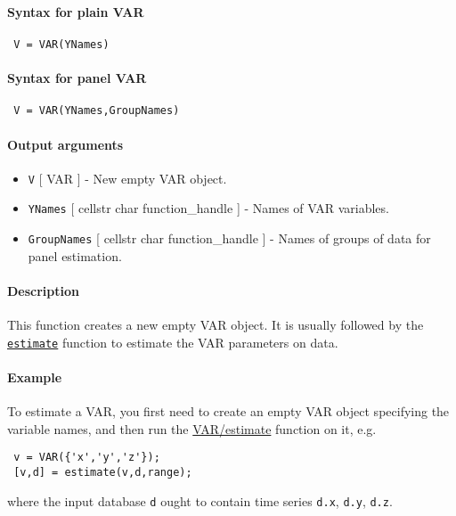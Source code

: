 


	\paragraph{Syntax for plain VAR}
 
 \begin{verbatim}
 V = VAR(YNames)
 \end{verbatim}
 
 \paragraph{Syntax for panel VAR}
 
 \begin{verbatim}
 V = VAR(YNames,GroupNames)
 \end{verbatim}
 
 \paragraph{Output arguments}
 
 \begin{itemize}
 \item
   \texttt{V} {[} VAR {]} - New empty VAR object.
 \item
   \texttt{YNames} {[} cellstr \textbar{} char \textbar{}
   function\_handle {]} - Names of VAR variables.
 \item
   \texttt{GroupNames} {[} cellstr \textbar{} char \textbar{}
   function\_handle {]} - Names of groups of data for panel estimation.
 \end{itemize}
 
 \paragraph{Description}
 
 This function creates a new empty VAR object. It is usually followed by
 the \href{VAR/estimate}{\texttt{estimate}} function to estimate the VAR
 parameters on data.
 
 \paragraph{Example}
 
 To estimate a VAR, you first need to create an empty VAR object
 specifying the variable names, and then run the
 \href{VAR/estimate}{VAR/estimate} function on it, e.g.
 
 \begin{verbatim}
 v = VAR({'x','y','z'});
 [v,d] = estimate(v,d,range);
 \end{verbatim}
 
 where the input database \texttt{d} ought to contain time series
 \texttt{d.x}, \texttt{d.y}, \texttt{d.z}.


